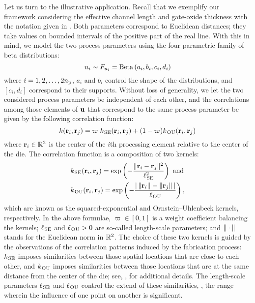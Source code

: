 Let us turn to the illustrative application.
Recall that we exemplify our framework considering the effective channel length and gate-oxide thickness with the notation given in .
Both parameters correspond to Euclidean distances; they take values on bounded intervals of the positive part of the real line.
With this in mind, we model the two process parameters using the four-parametric family of beta distributions:
\begin{equation*}
  u_i \sim F_{u_i} = \text{Beta}\left( a_i, b_i, c_i, d_i \right)
\end{equation*}
where $i = 1, 2, \dots, 2 {n_\text{p}}$, $a_i$ and $b_i$ control the shape of the distributions, and $[ c_i, d_i ]$ correspond to their supports.
Without loss of generality, we let the two considered process parameters be independent of each other, and the correlations among those elements of $\mathbf{u}$ that correspond to the same process parameter be given by the following correlation function:
\begin{equation} \elab{correlation-function}
  \fCorr(\vr_i, \vr_j) = \varpi \; \fCorrSE(\vr_i, \vr_j) + (1 - \varpi) \fCorrOU(\vr_i, \vr_j)
\end{equation}
where $\mathbf{r}_i \in \mathbb{R}^2$ is the center of the $i$th processing element relative to the center of the die. The correlation function is a composition of two kernels:
\begin{align*}
  & k_{\text{\kern0.1emSE}}(\mathbf{r}_i, \mathbf{r}_j) = \exp\left(- \frac{\| \mathbf{r}_i - \mathbf{r}_j \|_{}^2}{\ell_{\text{\kern0.1emSE}}^2} \right) \text{ and} \\
  & k_{\text{\kern0.1emOU}}(\mathbf{r}_i, \mathbf{r}_j) = \exp\left(- \frac{| \,\| \mathbf{r}_i \|_{} - \| \mathbf{r}_j \|_{}\, |}{\ell_{\text{\kern0.1emOU}}} \right),
\end{align*}
which are known as the squared-exponential and Ornstein--Uhlenbeck kernels, respectively.
In the above formulae, $\varpi \in [0, 1]$ is a weight coefficient balancing the kernels; $\ell_{\text{\kern0.1emSE}}$ and $\ell_{\text{\kern0.1emOU}} > 0$ are so-called length-scale parameters; and $\| \cdot \|_{}$ stands for the Euclidean norm in $\mathbb{R}^2$.
The choice of these two kernels is guided by the observations of the correlation patterns induced by the fabrication process: $k_{\text{\kern0.1emSE}}$ imposes similarities between those spatial locations that are close to each other, and $k_{\text{\kern0.1emOU}}$ imposes similarities between those locations that are at the same distance from the center of the die; see, \eg, \cite{friedberg2005} for additional details.
The length-scale parameters $\ell_{\text{\kern0.1emSE}}$ and $\ell_{\text{\kern0.1emOU}}$ control the extend of these similarities, \ie, the range wherein the influence of one point on another is significant.
